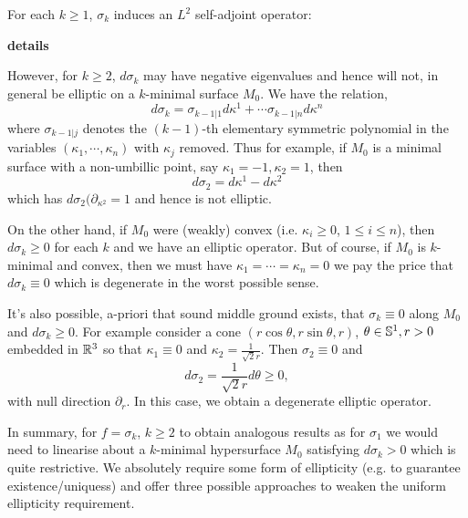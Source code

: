 \documentclass{amsart}
\begin{document}
For each \(k \geq 1\), \(\sigma_k\) induces an \(L^2\) self-adjoint operator:

\textbf{details}

However, for \(k \geq 2\), \(d\sigma_k\) may have negative eigenvalues and hence will not, in general be elliptic on a \(k\)-minimal surface \(M_0\). We have the relation,
\[
d\sigma_k = \sigma_{k-1|1} d\kappa^1 + \cdots \sigma_{k-1|n} d\kappa^n
\]
where \(\sigma_{k-1|j}\) denotes the \((k-1)\)-th elementary symmetric polynomial in the variables \((\kappa_1, \cdots, \kappa_n)\) with \(\kappa_j\) removed. Thus for example, if \(M_0\) is a minimal surface with a non-umbillic point, say \(\kappa_1 = -1, \kappa_2 = 1\), then
\[
d\sigma_2 = d\kappa^1 - d\kappa^2
\]
which has \(d\sigma_2 (\partial_{\kappa^2} = 1\) and hence is not elliptic.

On the other hand, if \(M_0\) were (weakly) convex (i.e. \(\kappa_i \geq 0\), \(1 \leq i \leq n\)), then \(d\sigma_k \geq 0\) for each \(k\) and we have an elliptic operator. But of course, if \(M_0\) is \(k\)-minimal and convex, then we must have \(\kappa_1 = \cdots = \kappa_n = 0\) we pay the price that \(d\sigma_k \equiv 0\) which is degenerate in the worst possible sense.

It's also possible, a-priori that sound middle ground exists, that \(\sigma_k \equiv 0\) along \(M_0\) and \(d\sigma_k \geq 0\). For example consider a cone \((r \cos \theta, r \sin\theta, r)\), \(\theta \in \S^1, r > 0\) embedded in \(\R^3\) so that \(\kappa_1 \equiv 0\) and \(\kappa_2 = \tfrac{1}{\sqrt{2} r}\). Then \(\sigma_2 \equiv 0\) and
\[
d\sigma_2 = \frac{1}{\sqrt{2} r} d\theta \geq 0,
\]
with null direction \(\partial_r\). In this case, we obtain a degenerate elliptic operator.

In summary, for \(f = \sigma_k\), \(k \geq 2\) to obtain analogous results as for \(\sigma_1\) we would need to linearise about a \(k\)-minimal hypersurface \(M_0\) satisfying \(d\sigma_k > 0\) which is quite restrictive. We absolutely require some form of ellipticity (e.g. to guarantee existence/uniquess) and offer three possible approaches to weaken the uniform ellipticity requirement.
\end{document}
